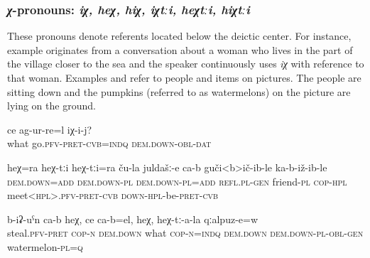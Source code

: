 
\subsubsection{\textit{χ}-pronouns: \textit{iχ, heχ, hiχ, iχtːi, heχtːi, hiχtːi}}
\label{sssec:x-pronouns}

These pronouns denote referents located below the deictic center. For instance, example  originates from a conversation about a woman who lives in the part of the village closer to the sea and the speaker continuously uses \textit{iχ} with reference to that woman. Examples  and  refer to people and items on pictures. The people are sitting down and the pumpkins (referred to as watermelons) on the picture are lying on the ground.

\begin{exe}
	\ex	\label{What happened to her?}
	\gll	ce	ag-ur-re=l	iχ-i-j?\\
		what	go.\textsc{pfv-pret-cvb}=\textsc{indq}	\textsc{dem.down}-\textsc{obl}-\textsc{dat}\\
	\glt	{}

	\ex	\label{He and they, his friends also meet and sit together.}
	\gll	heχ=ra	heχ-tːi	heχ-tːi=ra	ču-la	juldašː-e	ca-b	guči<b>ič-ib-le	ka-b-iž-ib-le\\
		\textsc{dem.down}=\textsc{add}	\textsc{dem.down}-\textsc{pl}	\textsc{dem.down}-\textsc{pl}=\textsc{add}	\textsc{refl}.\textsc{pl}-\textsc{gen}	friend-\textsc{pl}	\textsc{cop-hpl}	meet<\textsc{hpl}>.\textsc{pfv-pret-cvb}	\textsc{down}-\textsc{hpl}-be-\textsc{pret}-\textsc{cvb}\\
	\glt	{}

	\ex	\label{(They) stole it, whatever it is, this, their watermelons.}
	\gll	b-iʡ-uˁn ca-b	heχ,	ce	ca-b=el,	heχ,	heχ-tː-a-la	qːalpuz-e=w \\
		steal.\textsc{pfv}-\textsc{pret} \textsc{cop-n}	\textsc{dem.down}	what	\textsc{cop-n}=\textsc{indq}	\textsc{dem.down}	\textsc{dem.down}-\textsc{pl}-\textsc{obl}-\textsc{gen}	watermelon-\textsc{pl}=\textsc{q}\\
	\glt	{}
\end{exe}

